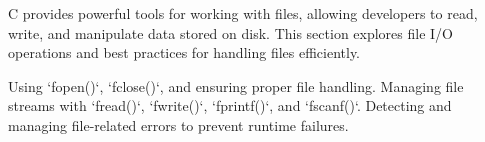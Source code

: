 \begin{NxSBox}
	\begin{NxIDBox}
		C provides powerful tools for working with files, allowing developers to read, write, and manipulate data stored on disk. This section explores file I/O operations and best practices for handling files efficiently.
	\end{NxIDBox}
	\begin{NxIDBoxL}
		 Using `fopen()`, `fclose()`, and ensuring proper file handling.
		 Managing file streams with `fread()`, `fwrite()`, `fprintf()`, and `fscanf()`.
		 Detecting and managing file-related errors to prevent runtime failures.
	\end{NxIDBoxL}
\end{NxSBox}

